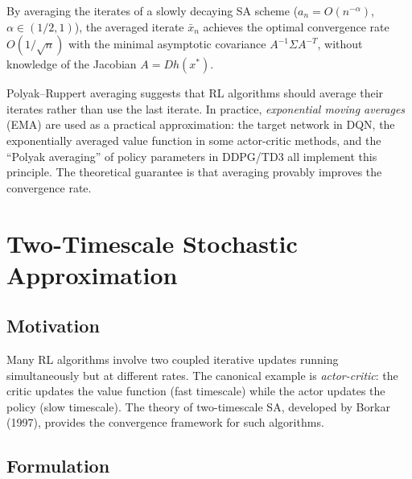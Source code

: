 \documentclass[11pt,a4paper]{article}
\theoremstyle{definition}
\theoremstyle{plain}
\theoremstyle{remark}
\begin{document}
\begin{keyresult}
By averaging the iterates of a slowly decaying SA scheme ($a_n = O(n^{-\alpha})$,
$\alpha \in (1/2,1)$), the averaged iterate $\bar{x}_n$ achieves the optimal
convergence rate $O(1/\sqrt{n})$ with the minimal asymptotic covariance
$A^{-1}\Sigma A^{-T}$, without knowledge of the Jacobian $A = Dh(x^*)$.
\end{keyresult}

\begin{rlconnection}
Polyak--Ruppert averaging suggests that RL algorithms should average their iterates
rather than use the last iterate. In practice, \emph{exponential moving averages}
(EMA) are used as a practical approximation: the target network in DQN, the
exponentially averaged value function in some actor-critic methods, and the
``Polyak averaging'' of policy parameters in DDPG/TD3 all implement this principle.
The theoretical guarantee is that averaging provably improves the convergence rate.
\end{rlconnection}


\section{Two-Timescale Stochastic Approximation}
\label{sec:two-timescale}

\subsection{Motivation}

Many RL algorithms involve two coupled iterative updates running simultaneously but
at different rates. The canonical example is \emph{actor-critic}: the critic updates
the value function (fast timescale) while the actor updates the policy (slow
timescale). The theory of two-timescale SA, developed by Borkar (1997), provides the
convergence framework for such algorithms.

\subsection{Formulation}
\end{document}
